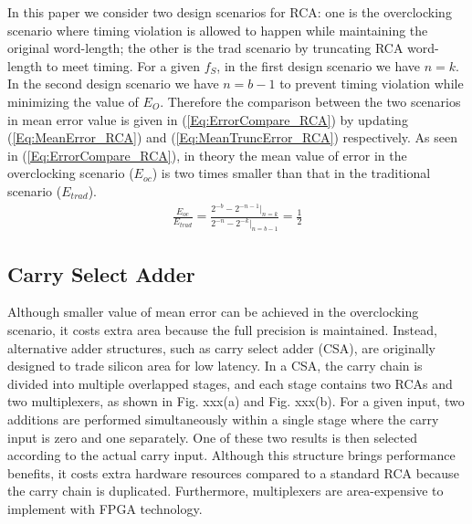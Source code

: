\documentclass[10pt, conference, compsocconf]{IEEEtran}
\begin{document}
In this paper we consider two design scenarios for RCA: one is the overclocking scenario where timing violation is allowed to happen while maintaining the original word-length; the other is the trad scenario by truncating RCA word-length to meet timing. For a given $f_S$, in the first design scenario we have $n=k$. In the second design scenario we have $n=b-1$ to prevent timing violation while minimizing the value of $E_O$. Therefore the comparison between the two scenarios in mean error value is given in (\ref{Eq:ErrorCompare_RCA}) by updating (\ref{Eq:MeanError_RCA}) and (\ref{Eq:MeanTruncError_RCA}) respectively. As seen in (\ref{Eq:ErrorCompare_RCA}), in theory the mean value of error in the overclocking scenario ($E_{oc}$) is two times smaller than that in the traditional scenario ($E_{trad}$).
%
\begin{eqnarray}\label{Eq:ErrorCompare_RCA}
    \frac{E_{oc}}{E_{trad}} = \frac{2^{-b}-2^{-n-1}|_{n=k}}{2^{-n}-2^{-k}|_{n=b-1}}=\frac{1}{2}
\end{eqnarray}

\subsection{Carry Select Adder}
Although smaller value of mean error can be achieved in the overclocking scenario, it costs extra area because the full precision is maintained. Instead, alternative adder structures, such as carry select adder (CSA), are originally designed to trade silicon area for low latency. In a CSA, the carry chain is divided into multiple overlapped stages, and each stage contains two RCAs and two multiplexers, as shown in Fig. xxx(a) and Fig. xxx(b). For a given input, two additions are performed simultaneously within a single stage where the carry input is zero and one separately. One of these two results is then selected according to the actual carry input. Although this structure brings performance benefits, it costs extra hardware resources compared to a standard RCA because the carry chain is duplicated. Furthermore, multiplexers are area-expensive to implement with FPGA technology.

\end{document}
